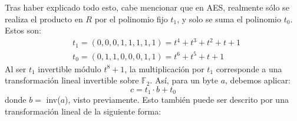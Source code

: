     Tras haber explicado todo esto, cabe mencionar que en AES, realmente sólo se realiza el producto en $R$ por el polinomio fijo $t_{1}$, y solo se suma el polinomio $t_{0}$. Estos son:
    \begin{align}
        &t_{1} = (0, 0, 0, 1, 1, 1, 1, 1) = t^{4} + t^{3} + t^{2} + t + 1 \\
        &t_{0} = (0, 1, 1, 0, 0, 0, 1, 1) = t^{6} + t^{5} + t + 1 
    \end{align}
    Al ser $t_{1}$ invertible módulo $t^{8} + 1$, la multiplicación por $t_{1}$ corresponde a una transformación lineal invertible sobre $\mathbb{F}_{2}$. Así, para un byte $a$, debemos aplicar:
    \begin{equation}
        c = t_{1} \cdot b + t_{0}
    \end{equation}
    donde $b =$ inv($a$), visto previamente. Esto también puede ser descrito por una transformación lineal de la siguiente forma:
